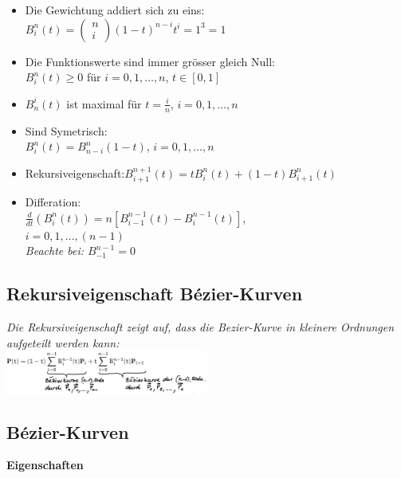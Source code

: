 \begin{itemize}
    \item Die Gewichtung addiert sich zu eins: \\
        $B_i^n(t) = \left(\begin{matrix}
            n \\ i
        \end{matrix}\right) (1 - t)^{n-i}t^i = 1^3 = 1$
    \item Die Funktionswerte sind immer grösser gleich Null:\\
        $B_i^n(t) \geq 0$ für $i = 0,1,\dots, n$, $t \in [0,1]$
    \item  $B^i_n(t)$ ist maximal für $t=\frac{i}{n}$, $i = 0,1,\dots, n$
    \item Sind Symetrisch: \\
          $B^n_i(t) = B^n_{n-i}(1-t)$, $i = 0,1,\dots, n$
    \item Rekursiveigenschaft:$B^{n+1}_{i+1}(t) = tB_i^n(t) + (1-t)B^n_{i+1}(t)$
    \item Differation: \\
        $\frac{d}{dt}(B^n_i(t)) = n[B^{n-1}_{i-1}(t) - B^{n-1}_i(t)]$,\\
        $i = 0,1,\dots, (n-1)$\\
        \textit{Beachte bei: $B_{-1}^{n-1}=0$}
\end{itemize}

\subsection{Rekursiveigenschaft Bézier-Kurven}

\textit{Die Rekursiveigenschaft zeigt auf, dass die Bezier-Kurve in
kleinere Ordnungen aufgeteilt werden kann:}\\

\includegraphics[width=0.5\textwidth]{assets/curves-recursive-spline.png}

\subsection{Bézier-Kurven}

\textbf{Eigenschaften}

